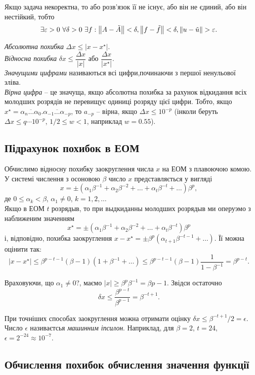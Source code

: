 Якщо задача  некоректна, то або розв'язок її не існує, або він не єдиний, або він нестійкий, тобто \[\exists \epsilon > 0 \ws \forall \delta > 0 \ws \exists f: \left\|A-\tilde A\right\|<\delta, \left\|f-\tilde f\right\|<\delta, \left\|u-\tilde u\right\|>\epsilon.\]

\textit{Абсолютна похибка} $\Delta x\le |x-x^\star|$.\\

\textit{Відносна похибка} $\delta x\le \dfrac{\Delta x}{|x|}$ або $\dfrac{\Delta x}{|x^\star|}$.\\

\textit{Значущими цифрами} називаються всі цифри,починаючи з першої ненульової зліва.\\ 

\textit{Вірна цифра} -- це значуща, якщо абсолютна похибка за рахунок відкидання всіх молодших розрядів не перевищує одиниці розряду цієї цифри. Тобто, якщо $x^\star = \overline{\alpha_n\ldots\alpha_0}.\overline{\alpha_{-1}\ldots\alpha_{-p}}$, то $a_{-p}$ -- вірна, якщо $\Delta x\le 10^{-p}$ (інколи беруть $\Delta x\le q\cdots 10^{-p}$, $1/2\le w<1$, наприклад $w=0.55$).

\subsection{Підрахунок похибок в ЕОМ}

Обчислимо відносну похибку заокруглення числа $x$ на ЕОМ з плавоючою комою. У системі числення з осоновою $\beta$ число $x$ представляється у вигляді \begin{equation} \label{eq:x-beta-basis} x=\pm\left(\alpha_1\beta^{-1}+\alpha_2\beta^{-2}+\ldots+\alpha_t\beta^{-t}+\ldots\right)\beta^p, \end{equation} де $0\le\alpha_k<\beta$, $\alpha_1\ne0$, $k=1,2,\ldots$\\

Якщо в ЕОМ $t$ розрядыв, то при выдкиданны молодших розрядыв ми оперуэмо з наближеним значенням \[x^\star = \pm\left(\alpha_1\beta^{-1}+\alpha_2\beta^{-2}+\ldots+\alpha_t\beta^{-t}\right)\beta^p\] і, відповідно, похибка заокруглення $x-x^\star = \pm \beta^p\left(\alpha_{t+1}\beta^{-t-1}+\ldots\right)$. Її можна оцінити так: \[|x-x^\star|\le \beta^{p-t-1}(\beta-1)(1+\beta^{-1}+\ldots)\le \beta^{p-t-1}(\beta - 1)\dfrac1{1-\beta^{-1}}=\beta^{p-t}.\]

Враховуючи, що $\alpha_1\ne 0$?, маємо $|x|\ge \beta^p\beta^{-1}=\beta{p-1}$. Звідси остаточно \[\delta x\le \dfrac{\beta^{p-t}}{\beta^{p-1}}=\beta^{-t+1}.\]

При точніших способах заокруглення можна отримати оцінку $\delta x\le \beta^{-t+1}/2=\epsilon$. Число $\epsilon$ називаєтсья \textit{машинним іпсилон}. Наприклад, для $\beta=2$, $t=24$, $\epsilon=2^{-24}\approx 10^{-7}$. 

\subsection{Обчислення похибок обчислення значення функції}



